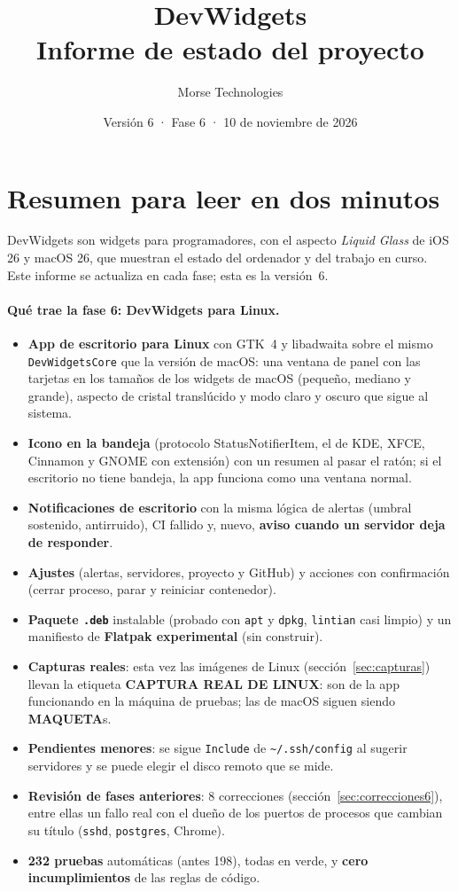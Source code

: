 \documentclass[11pt,a4paper]{article}
\title{DevWidgets\\\large Informe de estado del proyecto}
\author{Morse Technologies}
\date{Versión 6 · Fase 6 · 10 de noviembre de 2026}
\newcommand{\maqueta}{\textcolor{aviso}{\textbf{MAQUETA}}}
\newcommand{\capturareal}{\textcolor{real}{\textbf{CAPTURA REAL DE LINUX}}}
\begin{document}
\maketitle
\tableofcontents
\newpage

\section{Resumen para leer en dos minutos}
DevWidgets son widgets para programadores, con el aspecto
\emph{Liquid Glass} de iOS 26 y macOS 26, que muestran el estado del
ordenador y del trabajo en curso. Este informe se actualiza en cada
fase; esta es la versión~6.

\paragraph{Qué trae la fase 6: DevWidgets para Linux.}
\begin{itemize}
  \item \textbf{App de escritorio para Linux} con GTK~4 y libadwaita
    sobre el mismo \texttt{DevWidgetsCore} que la versión de macOS:
    una ventana de panel con las tarjetas en los tamaños de los widgets
    de macOS (pequeño, mediano y grande), aspecto de cristal
    translúcido y modo claro y oscuro que sigue al sistema.
  \item \textbf{Icono en la bandeja} (protocolo StatusNotifierItem,
    el de KDE, XFCE, Cinnamon y GNOME con extensión) con un resumen al
    pasar el ratón; si el escritorio no tiene bandeja, la app funciona
    como una ventana normal.
  \item \textbf{Notificaciones de escritorio} con la misma lógica de
    alertas (umbral sostenido, antirruido), CI fallido y, nuevo,
    \textbf{aviso cuando un servidor deja de responder}.
  \item \textbf{Ajustes} (alertas, servidores, proyecto y GitHub) y
    acciones con confirmación (cerrar proceso, parar y reiniciar
    contenedor).
  \item \textbf{Paquete \texttt{.deb}} instalable (probado con
    \texttt{apt} y \texttt{dpkg}, \texttt{lintian} casi limpio) y un
    manifiesto de \textbf{Flatpak experimental} (sin construir).
  \item \textbf{Capturas reales}: esta vez las imágenes de Linux
    (sección~\ref{sec:capturas}) llevan la etiqueta \capturareal{}:
    son de la app funcionando en la máquina de pruebas; las de macOS siguen siendo
    \maqueta{}s.
  \item \textbf{Pendientes menores}: se sigue \texttt{Include} de
    \texttt{\textasciitilde/.ssh/config} al sugerir servidores y se
    puede elegir el disco remoto que se mide.
  \item \textbf{Revisión de fases anteriores}: 8 correcciones
    (sección~\ref{sec:correcciones6}), entre ellas un fallo real con el
    dueño de los puertos de procesos que cambian su título
    (\texttt{sshd}, \texttt{postgres}, Chrome).
  \item \textbf{232 pruebas} automáticas (antes 198), todas en verde,
    y \textbf{cero incumplimientos} de las reglas de código.
\end{itemize}
\end{document}
